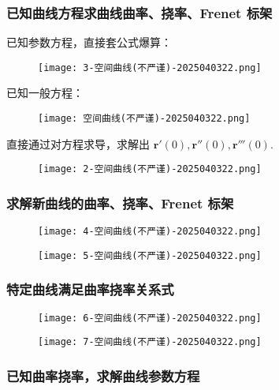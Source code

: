 \subsubsection{已知曲线方程求曲线曲率、挠率、Frenet 标架}

已知参数方程，直接套公式爆算：
\begin{figure}[H]
\centering
\texttt{[image: 3-空间曲线(不严谨)-2025040322.png]}
\label{}
\end{figure}
已知一般方程：
\begin{figure}[H]
\centering
\texttt{[image: 空间曲线(不严谨)-2025040322.png]}
\label{}
\end{figure}
直接通过对方程求导，求解出 $\boldsymbol{r}'(0),\boldsymbol{r}''(0),\boldsymbol{r}'''(0)$.
\begin{figure}[H]
\centering
\texttt{[image: 2-空间曲线(不严谨)-2025040322.png]}
\label{}
\end{figure}

\subsubsection{求解新曲线的曲率、挠率、Frenet 标架}

\begin{figure}[H]
\centering
\texttt{[image: 4-空间曲线(不严谨)-2025040322.png]}
\label{}
\end{figure}

\begin{figure}[H]
\centering
\texttt{[image: 5-空间曲线(不严谨)-2025040322.png]}
\label{}
\end{figure}

\subsubsection{特定曲线满足曲率挠率关系式}

\begin{figure}[H]
\centering
\texttt{[image: 6-空间曲线(不严谨)-2025040322.png]}
\label{}
\end{figure}

\begin{figure}[H]
\centering
\texttt{[image: 7-空间曲线(不严谨)-2025040322.png]}
\label{}
\end{figure}

\subsubsection{已知曲率挠率，求解曲线参数方程}

